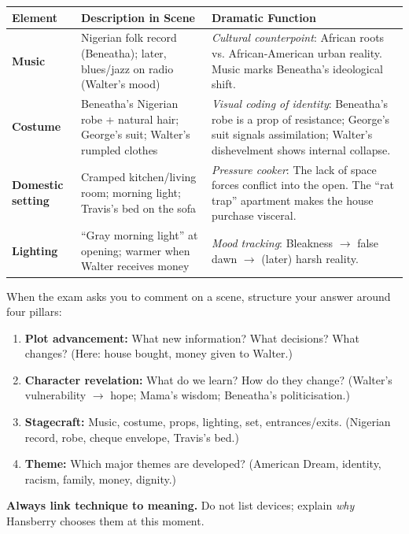 \documentclass[11pt]{article}
\newcommand{\cle}[1]{{\popxbold\color{popdark}#1}}
\begin{document}
\begin{center}
\begin{tabularx}{\linewidth}{|l|X|X|}
\hline
\rowcolor{popblueL}
\textbf{Element} & \textbf{Description in Scene} & \textbf{Dramatic Function} \\
\hline
\textbf{Music} & Nigerian folk record (Beneatha); later, blues/jazz on radio (Walter's mood) & \emph{Cultural counterpoint}: African roots vs. African‑American urban reality. Music marks Beneatha's ideological shift. \\
\hline
\textbf{Costume} & Beneatha's Nigerian robe + natural hair; George's suit; Walter's rumpled clothes & \emph{Visual coding of identity}: Beneatha's robe is a \cle{prop of resistance}; George's suit signals assimilation; Walter's dishevelment shows internal collapse. \\
\hline
\textbf{Domestic setting} & Cramped kitchen/living room; morning light; Travis's bed on the sofa & \emph{Pressure cooker}: The lack of space forces conflict into the open. The ``rat trap'' apartment makes the house purchase visceral. \\
\hline
\textbf{Lighting} & ``Gray morning light'' at opening; warmer when Walter receives money & \emph{Mood tracking}: Bleakness $\to$ false dawn $\to$ (later) harsh reality. \\
\hline
\end{tabularx}
\end{center}

\begin{methode}
When the exam asks you to comment on a scene, structure your answer around four pillars:
\begin{enumerate}
\item \textbf{Plot advancement:} What new information? What decisions? What changes? (Here: house bought, money given to Walter.)
\item \textbf{Character revelation:} What do we learn? How do they change? (Walter's vulnerability $\to$ hope; Mama's wisdom; Beneatha's politicisation.)
\item \textbf{Stagecraft:} Music, costume, props, lighting, set, entrances/exits. (Nigerian record, robe, cheque envelope, Travis's bed.)
\item \textbf{Theme:} Which major themes are developed? (American Dream, identity, racism, family, money, dignity.)
\end{enumerate}
\textbf{Always link technique to meaning.} Do not list devices; explain \emph{why} Hansberry chooses them at this moment.
\end{methode}
\end{document}
